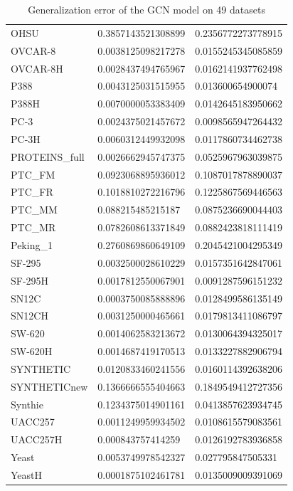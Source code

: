 \begin{table}[!ht]
\begin{tabular}{p{3.5cm}|p{5cm}p{5cm}}
        OHSU & 0.3857143521308899 & 0.2356772273778915 \\ 
        OVCAR-8 & 0.0038125098217278 & 0.0155245345085859 \\ 
        OVCAR-8H & 0.0028437494765967 & 0.0162141937762498 \\ 
        P388 & 0.0043125031515955 & 0.013600654900074 \\ 
        P388H & 0.0070000053383409 & 0.0142645183950662 \\ 
        PC-3 & 0.0024375021457672 & 0.0098565947264432 \\ 
        PC-3H & 0.0060312449932098 & 0.0117860734462738 \\ 
        PROTEINS\_full & 0.0026662945747375 & 0.0525967963039875 \\ 
        PTC\_FM & 0.0923068895936012 & 0.1087017878890037 \\ 
        PTC\_FR & 0.1018810272216796 & 0.1225867569446563 \\ 
        PTC\_MM & 0.088215485215187 & 0.0875236690044403 \\ 
        PTC\_MR & 0.0782608613371849 & 0.0882423818111419 \\ 
        Peking\_1 & 0.2760869860649109 & 0.2045421004295349 \\ 
        SF-295 & 0.0032500028610229 & 0.0157351642847061 \\ 
        SF-295H & 0.0017812550067901 & 0.0091287596151232 \\ 
        SN12C & 0.0003750085888896 & 0.0128499586135149 \\ 
        SN12CH & 0.0031250000465661 & 0.0179813411086797 \\ 
        SW-620 & 0.0014062583213672 & 0.0130064394325017 \\ 
        SW-620H & 0.0014687419170513 & 0.0133227882906794 \\ 
        SYNTHETIC & 0.0120833460241556 & 0.0160114392638206 \\ 
        SYNTHETICnew & 0.1366666555404663 & 0.1849549412727356 \\ 
        Synthie & 0.1234375014901161 & 0.0413857623934745 \\ 
        UACC257 & 0.0011249959934502 & 0.0108615579083561 \\ 
        UACC257H & 0.000843757414259 & 0.0126192783936858 \\ 
        Yeast & 0.0053749978542327 & 0.027795847505331 \\ 
        YeastH & 0.0001875102461781 & 0.0135009009391069 \\ 
    \bottomrule
    \end{tabular}
    \caption{Generalization error of the GCN model on 49 datasets}
    \label{tab:ge_gcn} %
\end{table}

